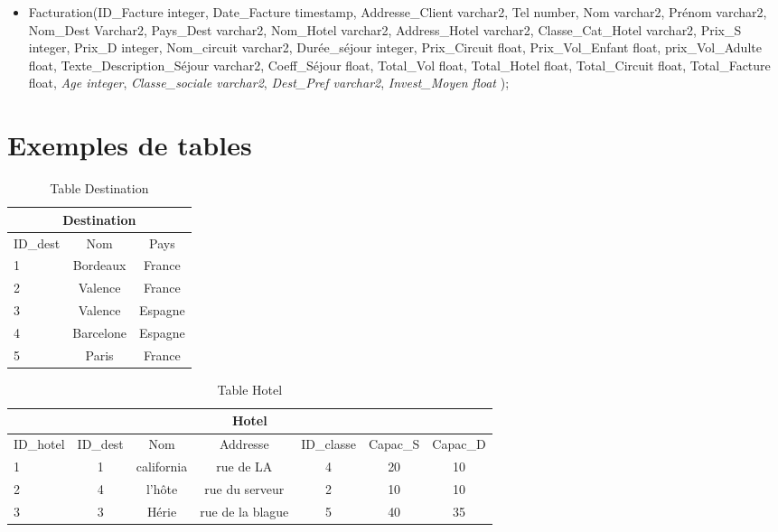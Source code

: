 \documentclass[10pt]{article}
\begin{document}
\begin{itemize}
\item Facturation(ID\_Facture integer, Date\_Facture timestamp, Addresse\_Client varchar2, Tel number, Nom varchar2, Prénom varchar2, Nom\_Dest Varchar2, Pays\_Dest varchar2, Nom\_Hotel varchar2, Address\_Hotel varchar2, Classe\_Cat\_Hotel varchar2, Prix\_S integer, Prix\_D integer, Nom\_circuit varchar2, Durée\_séjour integer, Prix\_Circuit float, Prix\_Vol\_Enfant float, prix\_Vol\_Adulte float, Texte\_Description\_Séjour varchar2, Coeff\_Séjour float, Total\_Vol float, Total\_Hotel float,  Total\_Circuit float, Total\_Facture float, \textit{Age integer}, \textit{Classe\_sociale varchar2}, \textit{Dest\_Pref varchar2}, \textit{Invest\_Moyen float} );\\
\end{itemize}

\section{Exemples de tables}


\begin{table}[h]
\begin{center}
\begin{tabular}{|l|c|c|}
\hline
\multicolumn{3}{|c|}{Destination}\\
\hline
ID\_dest& Nom & Pays \\
\hline
1 & Bordeaux& France\\
\hline
2 & Valence& France\\
\hline
3 & Valence& Espagne\\
\hline
4 & Barcelone& Espagne\\
\hline
5 & Paris& France\\
\hline
\end{tabular}
\end{center}
\caption{Table Destination}
\end{table}


\begin{table}[h]
\begin{center}
\begin{tabular}{|l|c|c|c|c|c|c|}
\hline
\multicolumn{7}{|c|}{Hotel}\\
\hline
ID\_hotel& ID\_dest& Nom & Addresse &ID\_classe & Capac\_S & Capac\_D  \\
\hline
1 & 1& california&rue de LA& 4 & 20 & 10\\
\hline
2 & 4& l'hôte&rue du serveur& 2 & 10 & 10\\
\hline
3 & 3& Hérie&rue de la blague& 5 & 40 & 35\\
\hline
\end{tabular}
\end{center}
\caption{Table Hotel}
\end{table}
\newpage
\end{document}
